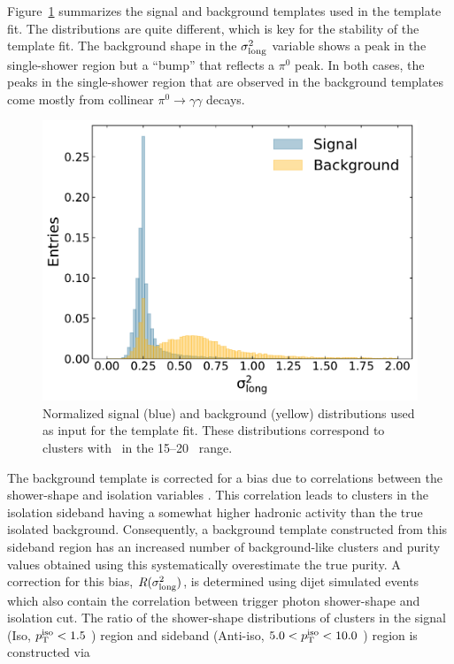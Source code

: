 Figure~\ref{TemplateShapes} summarizes the signal and background templates used in the template fit. The distributions are quite different, which is key for the stability of the template fit. The background shape in the $\sigma^{2}_{\mathrm{long}}$ variable shows a peak in the single-shower region but a ``bump'' that reflects a $\pi^{0}$ peak. In both cases, the peaks in the single-shower region that are observed in the background templates come mostly from collinear $\pi^{0}\to\gamma\gamma$ decays.

\begin{figure}
\center
\includegraphics[width=0.5\textheight]{Data_Analysis/Purity/norm-templates-p-Pb-cluster_Lambda-15-20.pdf}
\caption{Normalized signal (blue) and background (yellow) distributions used as input for the template fit. These distributions correspond to clusters with \pt~in the 15--20 \GeVc~range.}
\label{TemplateShapes}
\end{figure}


The background template is corrected for a bias due to correlations between the shower-shape and isolation variables \cite{Khachatryan:2010fm}. 
This correlation leads to clusters in the isolation sideband having a somewhat higher hadronic activity than the true isolated background. Consequently, a background template constructed from this sideband region has an increased number of background-like clusters and
purity values obtained using this
 systematically overestimate the true purity.
A correction for this bias, $R(\sigma^{2}_{\mathrm{long}})$, is determined using dijet simulated events which also contain the correlation between trigger photon shower-shape and isolation cut.
The ratio of the shower-shape distributions of clusters in the signal (Iso, $p_{\mathrm{T}}^\mathrm{iso} < 1.5$ \GeVc) region and sideband (Anti-iso, $5.0 < p_{\mathrm{T}}^\mathrm{iso} < 10.0$ \GeVc) region is constructed via

